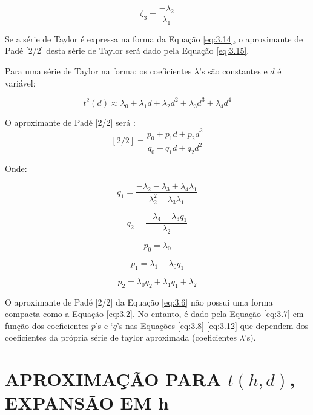 \begin{equation}
\label{eq:3.18}
 \zeta_3=\frac{-\lambda_2}{\lambda_1}
\end{equation}


Se a série de Taylor é expressa na forma da Equação \ref{eq:3.14}, o aproximante de Padé [2/2] desta série de Taylor 
será dado pela Equação \ref{eq:3.15}.

Para uma série de Taylor na forma; 
os coeficientes $\lambda$'s são constantes e $d$ é variável:

\begin{equation}
\label{eq:3.19}
 t^2(d) \approx \lambda_0+\lambda_1d+\lambda_2d^2+\lambda_3d^3+\lambda_4d^4
\end{equation}

O aproximante de Padé [2/2] será \cite{neves}:
\begin{equation}
\label{eq:3.20}
 [2/2]=\frac{p_0+p_1d+p_2d^2}{q_0+q_1d+q_2d^2}
\end{equation}

Onde:

\begin{equation}
\label{eq:3.21}
q_1=\frac{-\lambda_2-\lambda_3+\lambda_4\lambda_1}{\lambda_2^2-\lambda_3\lambda_1}
\end{equation}

\begin{equation}
\label{eq:3.22}
q_2=\frac{-\lambda_4-\lambda_3q_1}{\lambda_2}
\end{equation}

\begin{equation}
\label{eq:3.23}
 p_0=\lambda_0
\end{equation}

\begin{equation}
\label{eq:3.24}
 p_1=\lambda_1+\lambda_0q_1
\end{equation}

\begin{equation}
\label{eq:3.25}
p_2=\lambda_0q_2+\lambda_1q_1+\lambda_2
\end{equation}

O aproximante de Padé [2/2] da Equação \ref{eq:3.6} não possui uma forma compacta como a Equação \ref{eq:3.2}. 
No entanto, é
dado pela Equação \ref{eq:3.7} em função dos coeficientes $p$'s e `$q$'s nas Equações \ref{eq:3.8}-\ref{eq:3.12} 
que dependem
dos coeficientes da própria série de taylor aproximada (coeficientes $\lambda$'s).

\section{APROXIMAÇÃO PARA $t(h,d)$, EXPANSÃO EM h}
\label{sec:6.1}

